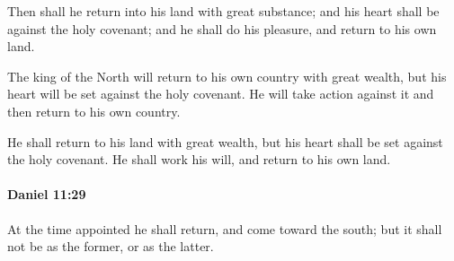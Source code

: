 			\begin{versebox}
					\item[BHS] 
					\item[LXX] 
					\item[ASV] Then shall he return into his land with great substance; and his heart shall be against the holy covenant; and he shall do his pleasure, and return to his own land.
					\item[NIV] The king of the North will return to his own country with great wealth, but his heart will be set against the holy covenant. He will take action against it and then return to his own country.
					\item[NRSV] He shall return to his land with great wealth, but his heart shall be set against the holy covenant. He shall work his will, and return to his own land.
			\end{versebox}

		\paragraph{Daniel 11:29} %
			\label{DANIEL-11-29}

			At the time appointed he shall return, and come toward the south; but it shall not be as the former, or as the latter.

